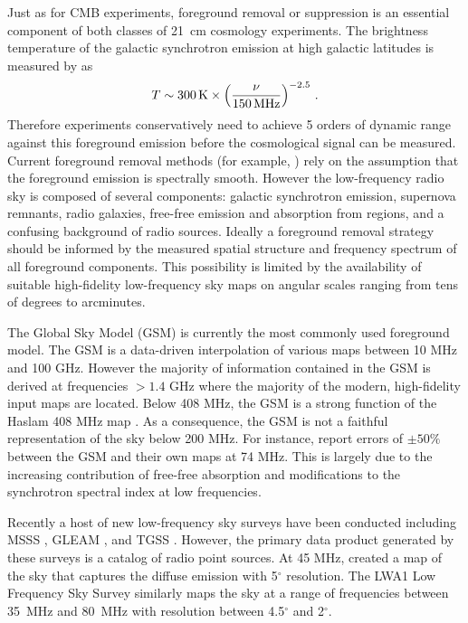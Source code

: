 \documentclass[twocolumn]{aastex61}
\begin{document}
Just as for CMB experiments, foreground removal or suppression is an essential component of both
classes of 21~cm cosmology experiments. The brightness temperature of the galactic synchrotron
emission at high galactic latitudes is measured by \citet{2008AJ....136..641R} as
\begin{equation}
    T \sim 300\,{\rm K} \times \left(\frac{\nu}{150\,{\rm MHz}}\right)^{-2.5}\,.
\end{equation}
Therefore experiments conservatively need to achieve 5 orders of dynamic range against this
foreground emission before the cosmological signal can be measured. Current foreground removal
methods (for example, \citealt{2012ApJ...756..165P}) rely on the assumption that the foreground
emission is spectrally smooth. However the low-frequency radio sky is composed of several
components: galactic synchrotron emission, supernova remnants, radio galaxies, free-free emission
and absorption from  regions, and a confusing background of radio sources.  Ideally a
foreground removal strategy should be informed by the measured spatial structure and frequency
spectrum of all foreground components.  This possibility is limited by the availability of suitable
high-fidelity low-frequency sky maps on angular scales ranging from tens of degrees to arcminutes.

The Global Sky Model (GSM) \citep{2008MNRAS.388..247D, 2017MNRAS.464.3486Z} is currently the most
commonly used foreground model. The GSM is a data-driven interpolation of various maps between 10
MHz and 100 GHz. However the majority of information contained in the GSM is derived at frequencies
$>1.4$ GHz where the majority of the modern, high-fidelity input maps are located.  Below 408 MHz,
the GSM is a strong function of the Haslam 408 MHz map \citep{1981A&A...100..209H,
1982A&AS...47....1H, 2015MNRAS.451.4311R}. As a consequence, the GSM is not a faithful
representation of the sky below 200 MHz. For instance, \citet{2017MNRAS.469.4537D} report errors of
$\pm 50\%$ between the GSM and their own maps at 74 MHz. This is largely due to the increasing
contribution of free-free absorption and modifications to the synchrotron spectral index at low
frequencies.

Recently a host of new low-frequency sky surveys have been conducted including MSSS
\citep{2015A&A...582A.123H}, GLEAM \citep{2015PASA...32...25W}, and TGSS
\citep{2017A&A...598A..78I}. However, the primary data product generated by these surveys is a
catalog of radio point sources. At 45 MHz, \citet{2011A&A...525A.138G} created a map of the sky that
captures the diffuse emission with 5$^\circ$ resolution.  The LWA1 Low Frequency Sky Survey
\citep{2017MNRAS.469.4537D} similarly maps the sky at a range of frequencies between 35~MHz and
80~MHz with resolution between 4.5$^\circ$ and 2$^\circ$.
\end{document}

